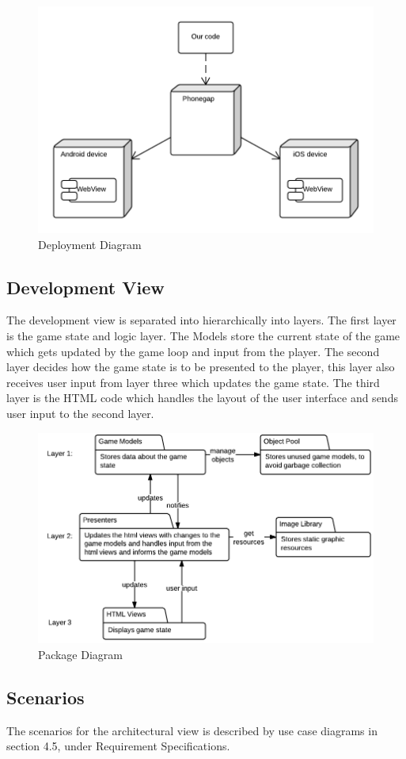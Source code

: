 	\begin{figure}[H]
		\centering
		\includegraphics[width=\textwidth]{pictures/deployment_diagram}
		\caption{Deployment Diagram}
	\end{figure}


\subsection*{Development View}

	The development view is separated into hierarchically into layers. The first layer is the game state 
	and logic layer. The Models store the current state of the game which gets updated by the game loop 
	and input from the player. The second layer decides how the game state is to be presented to the 
	player, this layer also receives user input from layer three which updates the game state. The third 
	layer is the HTML code which handles the layout of the user interface and sends user input to the
	second layer.

	\begin{figure}[H]
		\centering
		\includegraphics[scale=0.5]{pictures/development_view}
		\caption{Package Diagram}
	\end{figure}

\subsection*{Scenarios}
	
	The scenarios for the architectural view is described by use case diagrams in section 4.5, 
	under Requirement Specifications.



